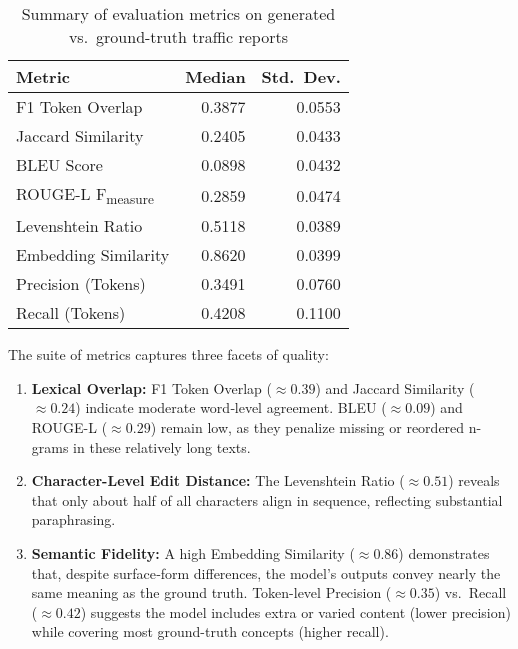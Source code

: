\begin{table}[ht]
  \centering
  \caption{Summary of evaluation metrics on generated vs.\ ground-truth traffic reports}
  \label{tab:metrics_summary}
  \begin{tabular}{lrr}
    \toprule
    \textbf{Metric}           & \textbf{Median} & \textbf{Std.\ Dev.} \\
    \midrule
    F1 Token Overlap          & 0.3877          & 0.0553              \\
    Jaccard Similarity        & 0.2405          & 0.0433              \\
    BLEU Score                & 0.0898          & 0.0432              \\
    ROUGE-L F\textsubscript{measure} & 0.2859    & 0.0474              \\
    Levenshtein Ratio         & 0.5118          & 0.0389              \\
    Embedding Similarity      & 0.8620          & 0.0399              \\
    Precision (Tokens)        & 0.3491          & 0.0760              \\
    Recall (Tokens)           & 0.4208          & 0.1100              \\
    \bottomrule
  \end{tabular}
\end{table}


The suite of metrics captures three facets of quality:
\begin{enumerate}
  \item \textbf{Lexical Overlap:}
    F1 Token Overlap (\(\approx 0.39\)) and Jaccard Similarity (\(\approx 0.24\)) indicate moderate word‐level agreement.
    BLEU (\(\approx 0.09\)) and ROUGE-L (\(\approx 0.29\)) remain low, as they penalize missing or reordered n-grams in these relatively long texts.
  \item \textbf{Character-Level Edit Distance:}
    The Levenshtein Ratio (\(\approx 0.51\)) reveals that only about half of all characters align in sequence, reflecting substantial paraphrasing.
  \item \textbf{Semantic Fidelity:}
    A high Embedding Similarity (\(\approx 0.86\)) demonstrates that, despite surface‐form differences, the model’s outputs convey nearly the same meaning as the ground truth.
    Token-level Precision (\(\approx 0.35\)) vs.\ Recall (\(\approx 0.42\)) suggests the model includes extra or varied content (lower precision) while covering most ground-truth concepts (higher recall).
\end{enumerate}

